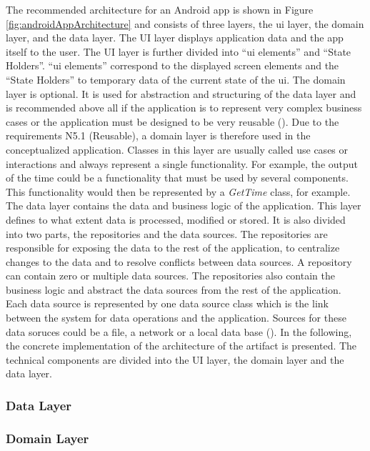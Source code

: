 The recommended architecture for an Android app is shown in Figure \ref{fig:androidAppArchitecture} and consists of three layers, the \ac{ui} layer, the domain layer, and the data layer. The UI layer displays application data and the app itself to the user. The UI layer is further divided into \enquote{\ac{ui} elements} and \enquote{State Holders}. \enquote{\ac{ui} elements} correspond to the displayed screen elements and the \enquote{State Holders} to temporary data of the current state of the \ac{ui}. The domain layer is optional. It is used for abstraction and structuring of the data layer and is recommended above all if the application is to represent very complex business cases or the application must be designed to be very reusable (\cite{Google.2023}). Due to the requirements N5.1 (Reusable), a domain layer is therefore used in the conceptualized application. Classes in this layer are usually called use cases or interactions and always represent a single functionality. For example, the output of the time could be a functionality that must be used by several components. This functionality would then be represented by a \textit{GetTime} class, for example. The data layer contains the data and business logic of the application. This layer defines to what extent data is processed, modified or stored. It is also divided into two parts, the repositories and the data sources. The repositories are responsible for exposing the data to the rest of the application, to centralize changes to the data and to resolve conflicts between data sources. A repository can contain zero or multiple data sources. The repositories also contain the business logic and abstract the data sources from the rest of the application. Each data source is represented by one data source class which is the link between the system for data operations and the application. Sources for these data soruces could be a file, a network or a local data base (\cite{Google.2023}). In the following, the concrete implementation of the architecture of the artifact is presented. The technical components are divided into the UI layer, the domain layer and the data layer. 



\subsubsection{Data Layer}

\subsubsection{Domain Layer}

